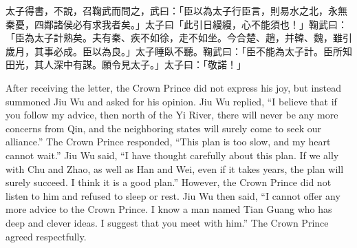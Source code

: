 \documentclass[12pt]{book}
\begin{document}
\begin{pairs}
\begin{Rightside}
\begin{chinese}
\beginnumbering
\pstart
太子得書，不說，召鞠武而問之，武曰：「臣以為太子行臣言，則易水之北，永無秦憂，四鄰諸侯必有求我者矣。」太子曰「此引日縵縵，心不能須也！」鞠武曰：「臣為太子計熟矣。夫有秦、疾不如徐，走不如坐。今合楚、趙，并韓、魏，雖引歲月，其事必成。臣以為良。」太子睡臥不聽。鞠武曰：「臣不能為太子計。臣所知田光，其人深中有謀。願令見太子。」太子曰：「敬諾！」
\pend
\endnumbering
\end{chinese}
\end{Rightside}
\begin{Leftside}
\begin{fioesjfsoeifj}
\beginnumbering
\pstart
After receiving the letter, the Crown Prince did not express his joy, but instead summoned Jiu Wu and asked for his opinion. Jiu Wu replied, ``I believe that if you follow my advice, then north of the Yi River, there will never be any more concerns from Qin, and the neighboring states will surely come to seek our alliance.'' The Crown Prince responded, ``This plan is too slow, and my heart cannot wait.'' Jiu Wu said, ``I have thought carefully about this plan. If we ally with Chu and Zhao, as well as Han and Wei, even if it takes years, the plan will surely succeed. I think it is a good plan.'' However, the Crown Prince did not listen to him and refused to sleep or rest. Jiu Wu then said, ``I cannot offer any more advice to the Crown Prince. I know a man named Tian Guang who has deep and clever ideas. I suggest that you meet with him.'' The Crown Prince agreed respectfully.\pend
\endnumbering
\end{fioesjfsoeifj}
\end{Leftside}
\end{pairs}
\Columns
\end{document}

